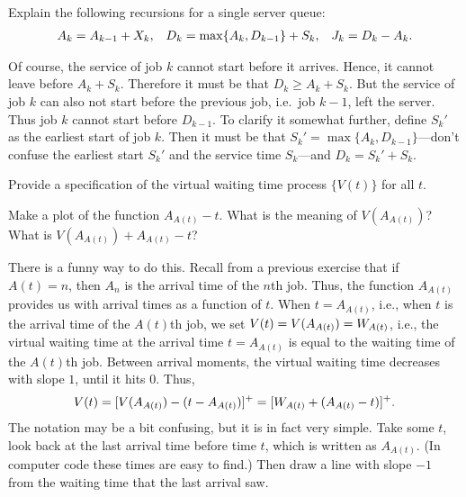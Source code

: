 \begin{exercise}\label{ex:l-149} 
Explain 
 the following recursions for a single server queue: 
\begin{align*}
 A_k &= A_{k-1} + X_k, &  D_k &= \max\{A_k, D_{k-1}\} + S_k, &  J_k = D_k - A_k.
 \end{align*}
\begin{solution}
  Of course, the service of job $k$ cannot start before it arrives.
  Hence, it cannot leave before $A_k + S_k$.
  Therefore it must be that $D_k \geq A_k +S_k$.
  But the service of job $k$ can also not start before the previous job, i.e.\ job $k-1$, left the server.
  Thus job $k$ cannot start before $D_{k-1}$.
  To clarify it somewhat further, define $S_k'$ as the earliest start of job $k$.
  Then it must be that $S_k' = \max\{A_k, D_{k-1}\}$---don't confuse the earliest start $S_k'$ and the service time $S_k$---and $D_k = S_k' + S_k$.
\end{solution}
\end{exercise}



\begin{exercise}\label{ex:l-150} 
 Provide a specification of the virtual waiting time process $\{V(t)\}$ for
 all $t$.
\begin{hint}Make a plot of the function $A_{A(t)}-t$. What is the meaning of $V(A_{A(t)})$? What is
$V(A_{A(t)}) + A_{A(t)}-t$?
\end{hint}
\begin{solution}
 There is a funny way to do this.
 Recall from a previous exercise that if $A(t)=n$, then $A_n$ is the arrival time of the $n$th job.
 Thus, the function $A_{A(t)}$ provides us with arrival times as a function of $t$.
 When $t=A_{A(t)}$, i.e., when $t$ is the arrival time of the $A(t)$th job, we set $V(t) = V(A_{A(t)}) = W_{A(t)}$, i.e., the virtual waiting time at the arrival time $t=A_{A(t)}$ is equal to the waiting time of the $A(t)$th job.
 Between arrival moments, the virtual waiting time decreases with slope $1$, until it hits 0.
 Thus,
 \begin{equation*}
 V(t) 
= [V(A_{A(t)}) - (t-A_{A(t)})]^+= [W_{A(t)} + (A_{A(t)}-t)]^+.
 \end{equation*}
 The notation may be a bit confusing, but it is in fact very simple.
 Take some $t$, look back at the last arrival time before time $t$, which is written as $A_{A(t)}$.
 (In computer code these times are easy to find.)
 Then draw a line with slope $-1$ from the waiting time that the last arrival saw.
\end{solution}
\end{exercise}



